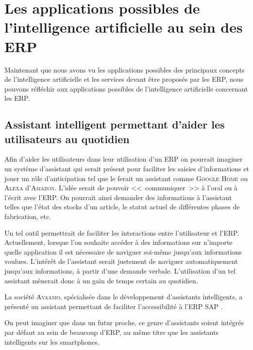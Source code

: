 \section{Les applications possibles de l'intelligence artificielle au sein des ERP}

Maintenant que nous avons vu les applications possibles des principaux concepts de l'intelligence artificielle et les services devant être proposés par les ERP, nous pouvons réfléchir aux applications possibles de l'intelligence artificielle concernant les ERP.



\newpage


\newpage


\newpage


\newpage
\subsection{Assistant intelligent permettant d'aider les utilisateurs au quotidien}

Afin d'aider les utilisateurs dans leur utilisation d'un ERP on pourrait imaginer un système d'assistant qui serait présent pour faciliter les saisies d'informations et jouer un rôle d'anticipation tel que le ferait un assistant comme \textsc{Google Home} ou \textsc{Alexa} d'\textsc{Amazon}.
L'idée serait de pouvoir <<~communiquer~>> à l'oral ou à l'écrit avec l'ERP.
On pourrait ainsi demander des informations à l'assistant telles que l'état des stocks d'un article, le statut actuel de différentes phases de fabrication, etc.

Un tel outil permettrait de faciliter les interactions entre l'utilisateur et l'ERP.
Actuellement, lorsque l'on souhaite accéder à des informations sur n'importe quelle application il est nécessaire de naviguer soi-même jusqu'aux informations voulues.
L'intérêt de l'assistant serait justement de naviguer automatiquement jusqu'aux informations, à partir d'une demande verbale.
L'utilisation d'un tel assistant mènerait donc à un gain de temps certain au quotidien.

La société \textsc{Avaamo}, spécialisée dans le développement d'assistants intelligents, a présenté un assistant permettant de faciliter l'accessibilité à l'ERP SAP \cite{assistant}.

On peut imaginer que dans un futur proche, ce genre d'assistants soient intégrés par défaut au sein de beaucoup d'ERP, au même titre que les assistants intelligents sur les smartphones.
